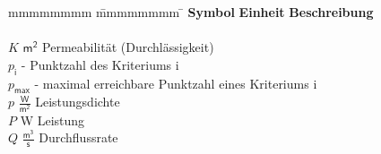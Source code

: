 

\begin{spacing}{1.5}
    \begin{tabbing}
        mmmmmmmm \= mmmmmmmm \= \kill
        \textbf{Symbol} \> \textbf{Einheit} \> \textbf{Beschreibung} \\ \vspace*{.5cm} \\
        $K$ \> $\mathsf{m^2}$ \> Permeabilität (Durchlässigkeit) \\
        $p_\mathsf{i}$ \> - \> Punktzahl des Kriteriums i \\
        $p_\mathsf{max}$ \> - \> maximal erreichbare Punktzahl eines Kriteriums i \\
        $p$ \> $\mathsf{\frac{W}{m^2}}$ \> Leistungsdichte \\
        $P$ \> W \> Leistung \\
        $Q$ \> $\mathsf{\frac{m^3}{s}}$ \> Durchflussrate 
    \end{tabbing}
\end{spacing}